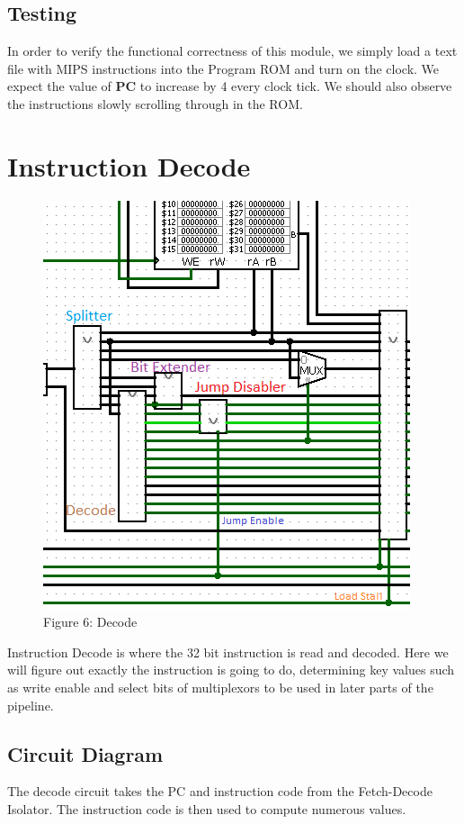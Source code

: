 \documentclass{article}
\begin{document}
\subsection{Testing}
In order to verify the functional correctness of this module, we simply load a text file with MIPS instructions into the Program ROM and turn on the clock. We expect the value of \textbf{PC} to increase by 4 every clock tick. We should also observe the instructions slowly scrolling through in the ROM.

\section{Instruction Decode}
\begin{figure}
\vspace{-2.1cm}
\begin{center}
\includegraphics[scale=0.75]{DecodeOut.png} \\
Figure 6: Decode
\end{center}
\vspace{-4cm}
\end{figure}
Instruction Decode is where the 32 bit instruction is read and decoded. Here we will figure out exactly the instruction is going to do, determining key values such as write enable and select bits of multiplexors to be used in later parts of the pipeline. 

\subsection{Circuit Diagram}
The decode circuit takes the PC and instruction code from the Fetch-Decode Isolator. The instruction code is then used to compute numerous values. 
\end{document}
